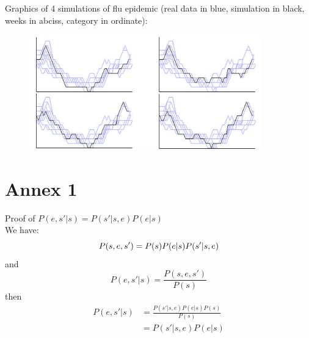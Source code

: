 \documentclass[12pt, a4paper]{article}
\begin{document}
Graphics of 4 simulations of flu epidemic (real data in blue, simulation in black, weeks in abciss, category in ordinate):\\
\begin{center}
\begin{figure}[H]
\centering
\includegraphics[width=10cm]{./flu.jpg}
\end{figure}
\end{center}

\newpage
\section{Annex 1}
\label{proofA}
Proof of $P(e,s'|s)=P(s'|s,e)P(e|s)$\\
We have:\\
$$
P(s,e,s')=P(s)P(e|s)P(s'|s,e)\\
$$
and\\
$$
P(e,s'|s)=\frac{P(s,e,s')}{P(s)}
$$
then\\
$$
\begin{array}{ll}
P(e,s'|s)&=\frac{P(s'|s,e)P(e|s)P(s)}{P(s)}\\
&=P(s'|s,e)P(e|s)\\
\end{array}
$$
\end{document}
